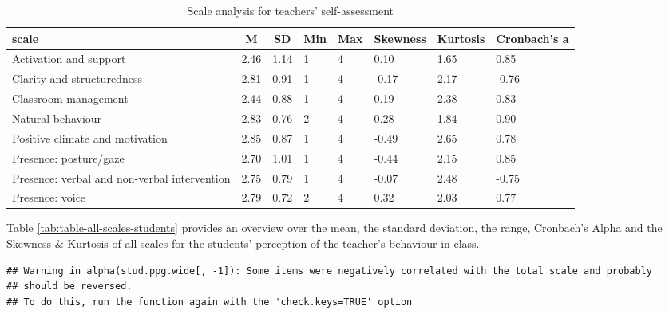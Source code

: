 \documentclass[
  english,
  man,floatsintext]{apa6}
\begin{document}
\begin{table}[h]

\begin{center}
\begin{threeparttable}

\caption{\label{tab:table-all-scales-self-assessment}Scale analysis for teachers' self-assessment}

\small{

\begin{tabular}{llllllll}
\toprule
scale & \multicolumn{1}{c}{M} & \multicolumn{1}{c}{SD} & \multicolumn{1}{c}{Min} & \multicolumn{1}{c}{Max} & \multicolumn{1}{c}{Skewness} & \multicolumn{1}{c}{Kurtosis} & \multicolumn{1}{c}{Cronbach's a}\\
\midrule
Activation and support & 2.46 & 1.14 & 1 & 4 & 0.10 & 1.65 & 0.85\\
Clarity and structuredness & 2.81 & 0.91 & 1 & 4 & -0.17 & 2.17 & -0.76\\
Classroom management & 2.44 & 0.88 & 1 & 4 & 0.19 & 2.38 & 0.83\\
Natural behaviour & 2.83 & 0.76 & 2 & 4 & 0.28 & 1.84 & 0.90\\
Positive climate and motivation & 2.85 & 0.87 & 1 & 4 & -0.49 & 2.65 & 0.78\\
Presence: posture/gaze & 2.70 & 1.01 & 1 & 4 & -0.44 & 2.15 & 0.85\\
Presence: verbal and non-verbal intervention & 2.75 & 0.79 & 1 & 4 & -0.07 & 2.48 & -0.75\\
Presence: voice & 2.79 & 0.72 & 2 & 4 & 0.32 & 2.03 & 0.77\\
\bottomrule
\end{tabular}

}

\end{threeparttable}
\end{center}

\end{table}

Table \ref{tab:table-all-scales-students} provides an overview over the mean, the standard deviation, the range, Cronbach's Alpha and the Skewness \& Kurtosis of all scales for the students' perception of the teacher's behaviour in class.

\begin{verbatim}
## Warning in alpha(stud.ppg.wide[, -1]): Some items were negatively correlated with the total scale and probably 
## should be reversed.  
## To do this, run the function again with the 'check.keys=TRUE' option
\end{verbatim}
\end{document}
